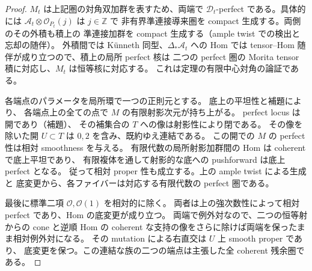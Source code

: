 \begin{proof}
$M_t$ は上記圏の対角双加群を表すため、両端で
$\mathcal D_t$-perfect である。具体的には
$\mathcal A_t\otimes\mathcal O_{P_t}(j)$ は $j\in\mathbb Z$ で
非有界準連接導来圏を compact 生成する。両側のその外積も積上の
準連接加群を compact 生成する（ample twist での検出と忘却の随伴）。
外積間では Künneth 同型、$\Delta_*\mathcal A_t$ への Hom では
tensor--Hom 随伴が成り立つので、積上の局所 perfect 核は
二つの perfect 圏の Morita tensor 積に対応し、$M_t$ は恒等核に対応する。
これは定理の有限中心対角の論証である。

各端点のパラメータを局所環で一つの正則元とする。
底上の平坦性と補題により、
各端点上の全ての点で $M$ の有限射影次元が持ち上がる。
perfect locus は開であり（補題）、
その補集合の $T$ への像は射影性により閉である。
その像を除いた開 $U\subset T$ は $0,2$ を含み、既約ゆえ連結である。
この開での $M$ の perfect 性は相対 smoothness を与える。
有限代数の局所射影加群間の Hom は coherent で底上平坦であり、
有限複体を通して射影的な底への pushforward は底上 perfect となる。
従って相対 proper 性も成立する。上の ample twist による生成と
底変更から、各ファイバーは対応する有限代数の perfect 圏である。

最後に標準二項 $\mathcal O,\mathcal O(1)$ を相対的に除く。
両者は上の強次数性によって相対 perfect であり、Hom の底変更が成り立つ。
両端で例外対なので、二つの恒等射からの cone と逆順 Hom の
coherent な支持の像をさらに除けば両端を保ったまま相対例外対になる。
その mutation による右直交は $U$ 上 smooth proper であり、
底変更を保つ。この連結な族の二つの端点は主張した全 coherent 残余圏である。
\end{proof}
